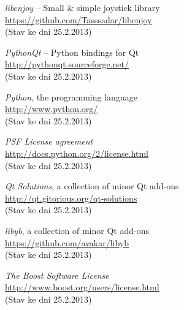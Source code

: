 \documentclass[12pt, a4paper, oneside]{article}
\newcommand{\It}{\textit}  %
\begin{document}
\begin{thebibliography}{99}
     \It{libenjoy} -- Small & simple joystick library \\
    \url{https://github.com/Tasssadar/libenjoy}\\
    (Stav ke dni 25.2.2013)

     \It{PythonQt} -- Python bindings for Qt \\
    \url{http://pythonqt.sourceforge.net/}\\
    (Stav ke dni 25.2.2013)

     \It{Python}, the programming language \\
    \url{http://www.python.org/}\\
    (Stav ke dni 25.2.2013)

     \It{PSF License agreement} \\
    \url{http://docs.python.org/2/license.html}\\
    (Stav ke dni 25.2.2013)

     \It{Qt Solutions}, a collection of minor Qt add-ons\\
    \url{http://qt.gitorious.org/qt-solutions}\\
    (Stav ke dni 25.2.2013)

     \It{libyb}, a collection of minor Qt add-ons\\
    \url{https://github.com/avakar/libyb}\\
    (Stav ke dni 25.2.2013)

     \It{The Boost Software License} \\
    \url{http://www.boost.org/users/license.html}\\
    (Stav ke dni 25.2.2013)

\end{thebibliography}
\end{document}
